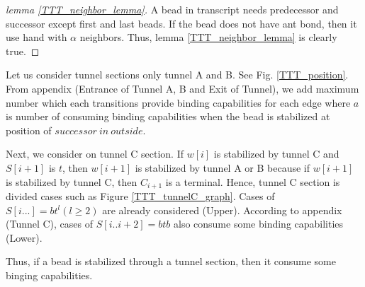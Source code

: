 \documentclass[runningheads]{llncs}
\begin{document}
\begin{proof}[lemma \ref{TTT_neighbor_lemma}]
A bead in transcript needs predecessor and successor except first and last beads. If the bead does not have ant bond, then it use hand with $\alpha$ neighbors. Thus, lemma \ref{TTT_neighbor_lemma} is clearly true.
\end{proof}

Let us consider tunnel sections only tunnel A and B. See Fig. \ref{TTT_position}. From appendix (Entrance of Tunnel A, B and Exit of Tunnel), we add maximum number which each transitions provide binding capabilities for each edge where $a$ is number of consuming binding capabilities when the bead is stabilized at position of $successor\ in\ outside$.


Next, we consider on tunnel C section. If $w[i]$ is stabilized by tunnel C and $S[i+1]$ is $t$, then $w[i+1]$ is stabilized by tunnel A or B because if $w[i+1]$ is stabilized by tunnel C, then $C_{i+1}$ is a terminal. Hence, tunnel C section is divided cases such as Figure \ref{TTT_tunnelC_graph}. Cases of $S[i...] = bt^l (l \geq 2)$ are already considered (Upper). According to appendix (Tunnel C), cases of $S[i..i+2] = btb$ also consume some binding capabilities (Lower).


Thus, if a bead is stabilized through a tunnel section, then it consume some binging capabilities.
\end{document}
